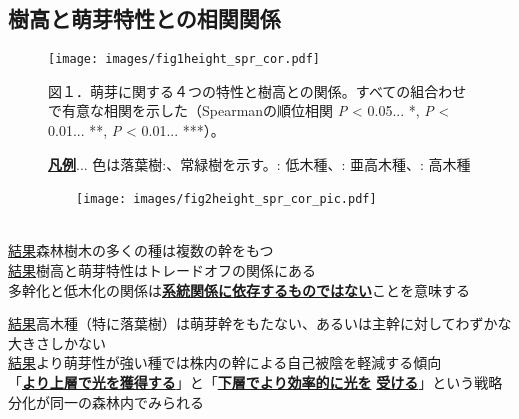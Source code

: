 \documentclass[a0, 30pt, plainboxedsections]{sciposter} %
\renewcommand{\baselinestretch}{1.2}
\begin{document}
\begin{multicols}{2}
\begin{mdframed}[style=subsection.frame,frametitle=\textbf{\LARGE{\ding{193}}\Large{樹高が高くなるほど萌芽性が強くなる}}]
\subsection*{樹高と萌芽特性との相関関係}

\begin{figure}
	\centering
		\texttt{[image: images/fig1height\_spr\_cor.pdf]} %
		
	{\tiny 図１．萌芽に関する４つの特性と樹高との関係。すべての組合わせで有意な相関を示した（Spearmanの順位相関 \textit{P} < 0.05... *, \textit{P} < 0.01... **, \textit{P} < 0.01... ***）。
   
   \textbf{\underline{凡例}}... 色は\textcolor{Orange1}{落葉樹}:、\textcolor{Blue1}{常緑樹}を示す。: 低木種、: 亜高木種、: 高木種}
\end{figure}

\begin{figure}
	\centering\hspace{-2em}
	　　\texttt{[image: images/fig2height\_spr\_cor\_pic.pdf]}\\
	　　
	　　\hspace{-2em}{\tiny 図２．系統独立対比による萌芽特性と樹高との関係。図１．同様の傾向を検出。萌芽幹BA比を除き、有意な相関関係をもつ。}
\end{figure}

\end{mdframed}

\renewcommand{\baselinestretch}{1.2}
\begin{mdframed}[style=conclusion.frame,frametitle={\textbf{\large{\faFlagAlt \vspace{0.02em} 結論: {萌芽性は最大樹高と相反して発達しており、\\多様な受光体制の存在が樹種の共存に貢献する}}}}]
  \vspace{0.4em}
  \flushleft
  \normalsize{\underline{結果}森林樹木の多くの種は複数の幹をもつ\\
  \underline{結果}樹高と萌芽特性はトレードオフの関係にある\\
  }
  \large{\faHandLeft \vspace{0.02em} 多幹化と低木化の関係は\textbf{\underline{系統関係に依存するものではない}}ことを意味する}
  
  \vspace{0.4em}
  \normalsize{\underline{結果}高木種（特に落葉樹）は萌芽幹をもたない、あるいは主幹に対してわずかな大きさしかない\\
  \underline{結果}より萌芽性が強い種では株内の幹による自己被陰を軽減する傾向\\
  }
  \large{\faHandLeft \vspace{0.02em} 「\textbf{\underline{より上層で光を獲得する}}」と「\textbf{\underline{下層でより効率的に光を}} \textbf{\underline{受ける}}」という戦略分化が同一の森林内でみられる
  }
 
\end{mdframed}

\end{multicols}

\end{document}
